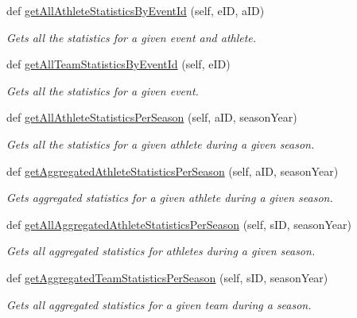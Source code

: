 \begin{DoxyCompactItemize}
\item 
def \hyperlink{classhandler_1_1volleyball__event_1_1_volleyball_event_handler_aa7490b8d47d54bc0f190fa23e9b2d1b0}{get\+All\+Athlete\+Statistics\+By\+Event\+Id} (self, e\+ID, a\+ID)
\begin{DoxyCompactList}\small\item\em Gets all the statistics for a given event and athlete. \end{DoxyCompactList}\item 
def \hyperlink{classhandler_1_1volleyball__event_1_1_volleyball_event_handler_a21c5039e1c25a12fe96c06582a511688}{get\+All\+Team\+Statistics\+By\+Event\+Id} (self, e\+ID)
\begin{DoxyCompactList}\small\item\em Gets all the statistics for a given event. \end{DoxyCompactList}\item 
def \hyperlink{classhandler_1_1volleyball__event_1_1_volleyball_event_handler_a7a57d2413855350d72d5650f568d0688}{get\+All\+Athlete\+Statistics\+Per\+Season} (self, a\+ID, season\+Year)
\begin{DoxyCompactList}\small\item\em Gets all the statistics for a given athlete during a given season. \end{DoxyCompactList}\item 
def \hyperlink{classhandler_1_1volleyball__event_1_1_volleyball_event_handler_ae5eef41ff08e9b80e4b04b05f34e1f79}{get\+Aggregated\+Athlete\+Statistics\+Per\+Season} (self, a\+ID, season\+Year)
\begin{DoxyCompactList}\small\item\em Gets aggregated statistics for a given athlete during a given season. \end{DoxyCompactList}\item 
def \hyperlink{classhandler_1_1volleyball__event_1_1_volleyball_event_handler_a2ea2936805e7bc39b69f731cf615efe6}{get\+All\+Aggregated\+Athlete\+Statistics\+Per\+Season} (self, s\+ID, season\+Year)
\begin{DoxyCompactList}\small\item\em Gets all aggregated statistics for athletes during a given season. \end{DoxyCompactList}\item 
def \hyperlink{classhandler_1_1volleyball__event_1_1_volleyball_event_handler_a9615712d5c8187f25803a4ecfc395ab5}{get\+Aggregated\+Team\+Statistics\+Per\+Season} (self, s\+ID, season\+Year)
\begin{DoxyCompactList}\small\item\em Gets all aggregated statistics for a given team during a season. \end{DoxyCompactList}\item 

\end{DoxyCompactItemize}
